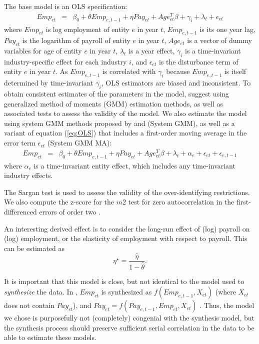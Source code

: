 The base model is an OLS specification:
\begin{eqnarray}	
\label{eq:OLS}
Emp_{et} & = & \beta_0 + \theta Emp_{e,t-1} + \eta Pay_{et} + Age_{et}^{T}\beta + \gamma_i + \lambda_t + \epsilon_{et}
\end{eqnarray}
where $Emp_{et}$ is log employment of entity $e$ in year $t$, $Emp_{e,t-1}$ is its one year lag, $Pay_{et}$ is the logarithm of payroll of entity $e$ in year $t$, $Age_{et}$ is a vector of dummy variables for age of entity $e$ in year $t$, $\lambda_t$ is a year  effect, $\gamma_i$ is a time-invariant industry-specific effect for each industry $i$, and $\epsilon_{et}$ is the disturbance term of entity $e$ in year $t$. 
As $Emp_{e,t-1}$ is correlated with $\gamma_{i}$ because $Emp_{e,t-1}$ is itself determined by time-invariant $\gamma_{i}$, OLS estimators are biased and inconsistent. To obtain consistent estimates of the parameters in the model, \textcite{RePEc:oup:restud:v:58:y:1991:i:2:p:277-297.} suggest using  generalized method of moments (GMM) estimation methods, as well as associated tests to assess the  validity of the model.  
%
We also estimate the model using system GMM methods proposed by \textcite{RePEc:eee:econom:v:68:y:1995:i:1:p:29-51} and \textcite{RePEc:eee:econom:v:87:y:1998:i:1:p:115-143} (System GMM), as well as a variant of equation (\ref{eq:OLS}) that includes a first-order moving average in the error term $\epsilon_{et}$ (System GMM MA):
\begin{eqnarray}	
Emp_{et}&=&\beta_{0} +\theta Emp_{e,t-1}+\eta Pay_{et} + Age_{et}^{T}\beta + \lambda_t +\alpha_e   + \epsilon_{et} + \epsilon_{e,t-1}
\end{eqnarray}
where $\alpha_e$ is a time-invariant entity effect, which includes any time-invariant industry effects.

The Sargan test \parencite{hansen_large_1982,RePEc:oup:restud:v:58:y:1991:i:2:p:277-297.,blundell_estimation_2001} is used to assess the validity of the over-identifying restrictions. We also compute the z-score for the $m2$ test for zero autocorrelation in the  first-differenced errors of order two \parencite{RePEc:oup:restud:v:58:y:1991:i:2:p:277-297.}. 

An interesting derived effect is to consider the long-run effect of (log) payroll on (log) employment, or the elasticity of employment with respect to payroll. This can be estimated as
$$
\eta^\star = \frac{\hat{\eta}}{1-\hat{\theta}}.
$$

It is important that this model is close, but not identical to the model used to \textit{synthesize} the data. In \SynLBD, $Emp_{et}$ is synthesized as $f(Emp_{e,t-1},X_{et})$ (where $X_{et}$ does not contain $Pay_{et}$), and $Pay_{et} = f(Pay_{e,t-1},Emp_{et},X_{et})$ \citep[pg. 366]{KinneyEtAl2011}. Thus, the model we chose is purposefully not (completely) congenial with the synthesis model, but the synthesis process \SynLBD{} should preserve sufficient serial correlation in the data to be able to estimate these models.

